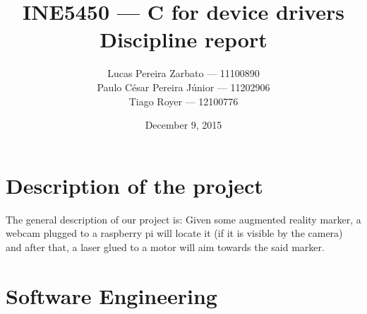 \documentclass{article}
\begin{document}
\title{
    INE5450 --- C for device drivers \\
    Discipline report
}
\author{
    Lucas Pereira Zarbato --- 11100890 \\
    Paulo César Pereira Júnior --- 11202906 \\
    Tiago Royer --- 12100776
}
\date{December 9, 2015}
\maketitle

\section{Description of the project}

The general description of our project is:
Given some augmented reality marker, a webcam plugged to
a raspberry pi will locate it (if it is visible by the camera)
and after that, a laser glued to a motor will aim towards the said marker.

\section{Software Engineering}
\end{document}
